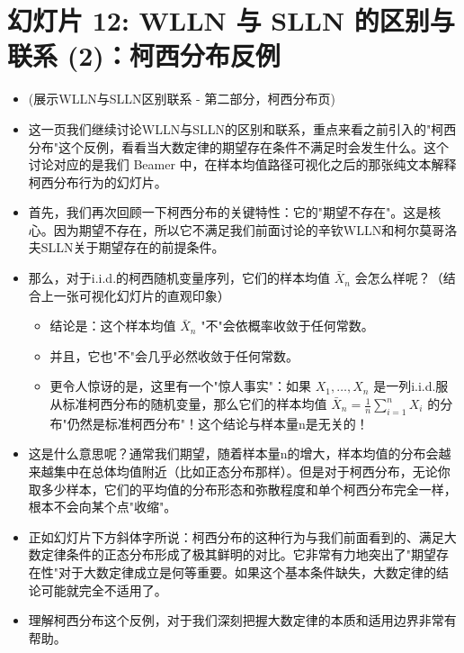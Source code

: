 \documentclass[UTF8]{article} %
\begin{document}
\section*{幻灯片 12: WLLN 与 SLLN 的区别与联系 (2)：柯西分布反例}
\begin{itemize}
    \itemsep1em
    \item (展示WLLN与SLLN区别联系 - 第二部分，柯西分布页)
    \item 这一页我们继续讨论WLLN与SLLN的区别和联系，重点来看之前引入的"柯西分布"这个反例，看看当大数定律的期望存在条件不满足时会发生什么。这个讨论对应的是我们 Beamer 中，在样本均值路径可视化之后的那张纯文本解释柯西分布行为的幻灯片。
    \item 首先，我们再次回顾一下柯西分布的关键特性：它的"期望不存在"。这是核心。因为期望不存在，所以它不满足我们前面讨论的辛钦WLLN和柯尔莫哥洛夫SLLN关于期望存在的前提条件。
    \item 那么，对于i.i.d.的柯西随机变量序列，它们的样本均值 $\bar{X}_n$ 会怎么样呢？（结合上一张可视化幻灯片的直观印象）
    \begin{itemize}[label=\textbullet, itemsep=0.3em]
        \item 结论是：这个样本均值 $\bar{X}_n$ "不"会依概率收敛于任何常数。
        \item 并且，它也"不"会几乎必然收敛于任何常数。
        \item 更令人惊讶的是，这里有一个"惊人事实"：如果 $X_1, \dots, X_n$ 是一列i.i.d.服从标准柯西分布的随机变量，那么它们的样本均值 $\bar{X}_n = \frac{1}{n} \sum_{i=1}^n X_i$ 的分布"仍然是标准柯西分布"！这个结论与样本量n是无关的！
    \end{itemize}
    \item 这是什么意思呢？通常我们期望，随着样本量n的增大，样本均值的分布会越来越集中在总体均值附近（比如正态分布那样）。但是对于柯西分布，无论你取多少样本，它们的平均值的分布形态和弥散程度和单个柯西分布完全一样，根本不会向某个点"收缩"。
    \item 正如幻灯片下方斜体字所说：柯西分布的这种行为与我们前面看到的、满足大数定律条件的正态分布形成了极其鲜明的对比。它非常有力地突出了"期望存在性"对于大数定律成立是何等重要。如果这个基本条件缺失，大数定律的结论可能就完全不适用了。
    \item 理解柯西分布这个反例，对于我们深刻把握大数定律的本质和适用边界非常有帮助。
\end{itemize}
\end{document}
